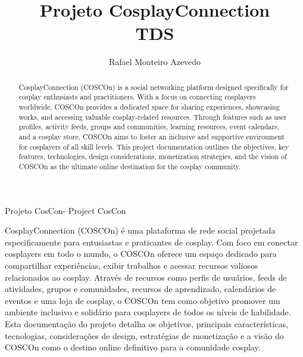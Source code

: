 \documentclass[12pt,a4paper,chapter=TITLE,section=TITLE,subsection=TITLE,subsubsection=TITLE]{article}
\title{Projeto CosplayConnection\\ TDS }
\author{Rafael Monteiro Azevedo\inst{1} }
\begin{document}
  


\frenchspacing 


%
%

\maketitle
Projeto CosCon-
Project CosCon

\begin{abstract}
  CosplayConnection (COSCOn) is a social networking platform designed specifically for cosplay enthusiasts and practitioners. With a focus on connecting cosplayers worldwide, COSCOn provides a dedicated space for sharing experiences, showcasing works, and accessing valuable cosplay-related resources. Through features such as user profiles, activity feeds, groups and communities, learning resources, event calendars, and a cosplay store, COSCOn aims to foster an inclusive and supportive environment for cosplayers of all skill levels. This project documentation outlines the objectives, key features, technologies, design considerations, monetization strategies, and the vision of COSCOn as the ultimate online destination for the cosplay community.
\end{abstract}
     
\begin{resumo1} 
  CosplayConnection (COSCOn) é uma plataforma de rede social projetada especificamente para entusiastas e praticantes de cosplay. Com foco em conectar cosplayers em todo o mundo, o COSCOn oferece um espaço dedicado para compartilhar experiências, exibir trabalhos e acessar recursos valiosos relacionados ao cosplay. Através de recursos como perfis de usuários, feeds de atividades, grupos e comunidades, recursos de aprendizado, calendários de eventos e uma loja de cosplay, o COSCOn tem como objetivo promover um ambiente inclusivo e solidário para cosplayers de todos os níveis de habilidade. Esta documentação do projeto detalha os objetivos, principais características, tecnologias, considerações de design, estratégias de monetização e a visão do COSCOn como o destino online definitivo para a comunidade cosplay.
\end{resumo1}
\end{document}
